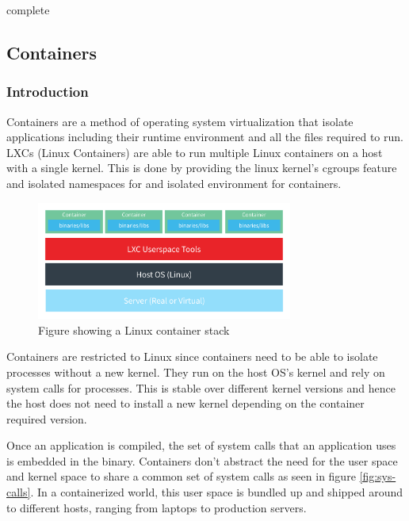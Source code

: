 \documentclass[american]{article}
\newcommand{\complete}{
	\gls{complete}
}
\begin{document}
\complete

\subsection{Containers} \label{sec:software-containers}

\subsubsection{Introduction}

Containers are a method of operating system virtualization that isolate applications including their runtime environment and all the files required to run. LXCs (Linux Containers) are able to run multiple Linux containers on a host with a single kernel. This is done by providing the linux kernel's cgroups feature and isolated namespaces for and isolated environment for containers\cite{containers-hierarchy}.

\begin{figure}[h]
    \centering
    \includegraphics[width=0.75\textwidth]{containers-intro}
    \caption{Figure showing a Linux container stack}
    \label{fig:containers-intro}
\end{figure}

Containers are restricted to Linux since containers need to be able to isolate processes without a new kernel. They run on the host OS's kernel and rely on system calls for processes. This is stable over different kernel versions and hence the host does not need to install a new kernel depending on the container required version\cite{kernel-space-redhat}.

Once an application is compiled, the set of system calls that an application uses is embedded in the binary. Containers don't abstract the need for the user space and kernel space to share a common set of system calls as seen in figure \ref{fig:sys-calls}. In a containerized world, this user space is bundled up and shipped around to different hosts, ranging from laptops to production servers.
\end{document}
